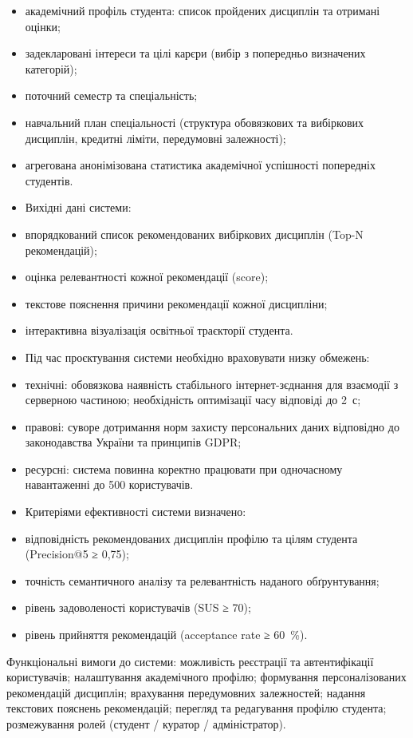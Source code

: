 \documentclass[
]{article}
\begin{document}
\begin{itemize}
\item
  академічний профіль студента: список пройдених дисциплін та отримані
  оцінки;
\item
  задекларовані інтереси та цілі кар\textquotesingle єри (вибір з
  попередньо визначених категорій);
\item
  поточний семестр та спеціальність;
\item
  навчальний план спеціальності (структура обов\textquotesingle язкових
  та вибіркових дисциплін, кредитні ліміти, передумовні залежності);
\item
  агрегована анонімізована статистика академічної успішності попередніх
  студентів.
\item
  Вихідні дані системи:
\item
  впорядкований список рекомендованих вибіркових дисциплін (Top-N
  рекомендацій);
\item
  оцінка релевантності кожної рекомендації (score);
\item
  текстове пояснення причини рекомендації кожної дисципліни;
\item
  інтерактивна візуалізація освітньої траєкторії студента.
\item
  Під час проєктування системи необхідно враховувати низку обмежень:
\item
  технічні: обов\textquotesingle язкова наявність стабільного
  інтернет-з\textquotesingle єднання для взаємодії з серверною частиною;
  необхідність оптимізації часу відповіді до 2~с;
\item
  правові: суворе дотримання норм захисту персональних даних відповідно
  до законодавства України та принципів GDPR;
\item
  ресурсні: система повинна коректно працювати при одночасному
  навантаженні до 500 користувачів.
\item
  Критеріями ефективності системи визначено:
\item
  відповідність рекомендованих дисциплін профілю та цілям студента
  (Precision@5 ≥ 0,75);
\item
  точність семантичного аналізу та релевантність наданого обґрунтування;
\item
  рівень задоволеності користувачів (SUS ≥ 70);
\item
  рівень прийняття рекомендацій (acceptance rate ≥ 60~\%).
\end{itemize}

Функціональні вимоги до системи: можливість реєстрації та автентифікації
користувачів; налаштування академічного профілю; формування
персоналізованих рекомендацій дисциплін; врахування передумовних
залежностей; надання текстових пояснень рекомендацій; перегляд та
редагування профілю студента; розмежування ролей (студент / куратор /
адміністратор).
\end{document}
